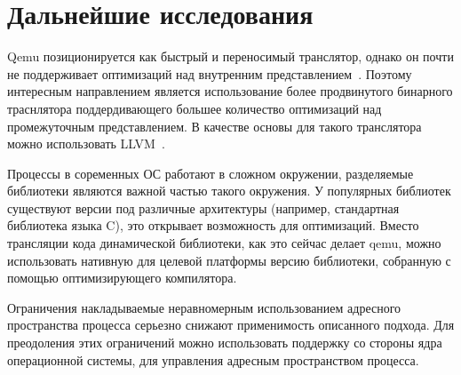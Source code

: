 \section{Дальнейшие исследования}

Qemu позиционируется как быстрый и переносимый транслятор, однако он почти не поддерживает оптимизаций над внутренним представлением~\cite{TCG}. Поэтому интересным направлением является использование более продвинутого бинарного траснлятора поддердивающего большее количество оптимизаций над промежуточным представлением. В качестве основы для такого транслятора можно использовать LLVM~\cite{LLVM}.

Процессы в соременных ОС работают в сложном окружении, разделяемые библиотеки являются важной частью такого окружения. У популярных библиотек существуют версии под различные архитектуры (например, стандартная библиотека языка C), это открывает возможность для оптимизаций. Вместо трансляции кода динамической библиотеки, как это сейчас делает qemu, можно использовать нативную для целевой платформы версию библиотеки, собранную с помощью оптимизирующего компилятора.

Ограничения накладываемые неравномерным использованием адресного пространства процесса серьезно снижают применимость описанного подхода. Для преодоления этих ограничений можно использовать поддержку со стороны ядра операционной системы, для управления адресным пространством процесса.

